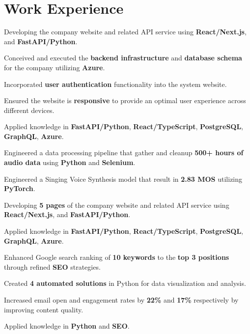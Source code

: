 \documentclass[a4paper,10pt]{article}
\begin{document}
\section{Work Experience}
\begin{tightitemize}
  \item Developing the company website and related API service using \textbf{React/Next.js}, and \textbf{FastAPI/Python}.
  \item Conceived and executed the \textbf{backend infrastructure} and \textbf{database schema} for the company utilizing \textbf{Azure}.
  \item Incorporated \textbf{user authentication} functionality into the system website.
  \item Ensured the website is \textbf{responsive} to provide an optimal user experience across different devices.
  \item Applied knowledge in \textbf{FastAPI/Python}, \textbf{React/TypeScript}, \textbf{PostgreSQL}, \textbf{GraphQL}, \textbf{Azure}.
\end{tightitemize}

\begin{tightitemize}
  \item Engineered a data processing pipeline that gather and cleanup \textbf{500+ hours of audio data} using \textbf{Python} and \textbf{Selenium}.
  \item Engineered a Singing Voice Synthesis model that result in \textbf{2.83 MOS} utilizing \textbf{PyTorch}.
  \item Developing \textbf{5 pages} of the company website and related API service using \textbf{React/Next.js}, and \textbf{FastAPI/Python}.
  \item Applied knowledge in \textbf{FastAPI/Python}, \textbf{React/TypeScript}, \textbf{PostgreSQL}, \textbf{GraphQL}, \textbf{Azure}.
\end{tightitemize}

\begin{tightitemize}
  \item Enhanced Google search ranking of \textbf{10 keywords} to the \textbf{top 3 positions} through refined \textbf{SEO} strategies.
  \item Created \textbf{4 automated solutions} in Python for data visualization and analysis.
  \item Increased email open and engagement rates by \textbf{22\%} and \textbf{17\%} respectively by improving content quality.
  \item Applied knowledge in \textbf{Python} and \textbf{SEO}.
\end{tightitemize}
\end{document}
